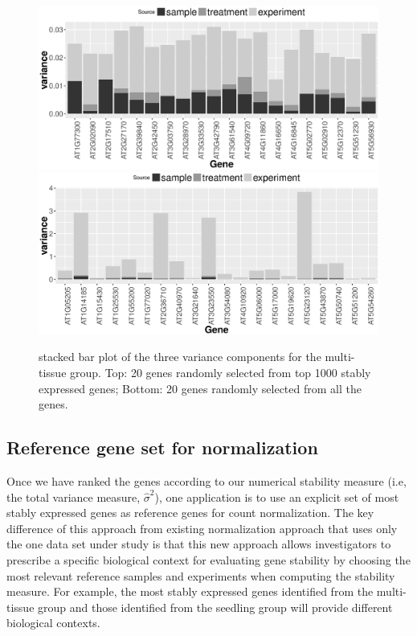 \documentclass[11pt, a4paper]{article}
\begin{document}
\begin{figure}[!h]
	\centering
	\includegraphics[width=0.8\linewidth]{Figures/top1000.eps}
	\includegraphics[width=0.8\linewidth]{Figures/all.eps}
	\caption{stacked bar plot of the three variance components for the multi-tissue group. Top: 20 genes randomly selected from top 1000 stably expressed genes; Bottom: 20 genes randomly selected from all the genes.}
	\label{fig:all}
\end{figure}


\subsection{Reference gene set for normalization}
\label{Section:commonReference}

Once we have ranked the genes according to our numerical stability measure
(i.e, the total variance measure, $\hat\sigma^2$), one application is to use
an explicit set of most stably expressed genes as reference genes for count
normalization. The key difference of this approach from existing normalization
approach that uses only the one data set under study is that this new approach
allows investigators to prescribe a specific biological context for evaluating
gene stability by choosing the most relevant reference samples and experiments
when computing the stability measure. For example, the most stably expressed
genes identified from the multi-tissue group and those identified from the
seedling group will provide different biological contexts.
\end{document}
